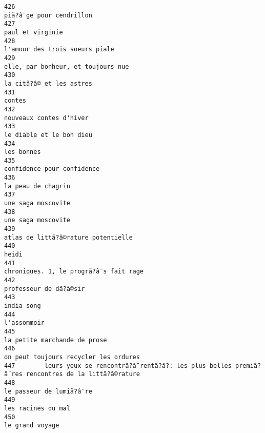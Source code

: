 \documentclass[
]{report}
\begin{document}
\begin{verbatim}
426                                                                                piã?â¨ge pour cendrillon
427                                                                                        paul et virginie
428                                                                          l'amour des trois soeurs piale
429                                                                      elle, par bonheur, et toujours nue
430                                                                                la citã?â© et les astres
431                                                                                                  contes
432                                                                                 nouveaux contes d'hiver
433                                                                                le diable et le bon dieu
434                                                                                              les bonnes
435                                                                              confidence pour confidence
436                                                                                      la peau de chagrin
437                                                                                      une saga moscovite
438                                                                                      une saga moscovite
439                                                                     atlas de littã?â©rature potentielle
440                                                                                                   heidi
441                                                                  chroniques. 1, le progrã?â¨s fait rage
442                                                                                  professeur de dã?â©sir
443                                                                                              india song
444                                                                                             l'assommoir
445                                                                            la petite marchande de prose
446                                                                   on peut toujours recycler les ordures
447        leurs yeux se rencontrã?â¨rentã?â?: les plus belles premiã?â¨res rencontres de la littã?â©rature
448                                                                                le passeur de lumiã?â¨re
449                                                                                      les racines du mal
450                                                                                         le grand voyage

\end{verbatim}
\end{document}
